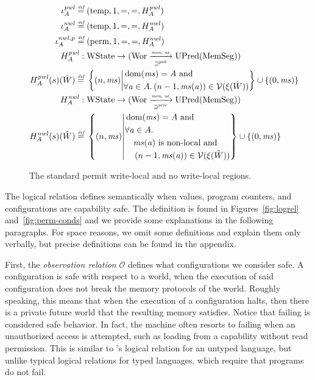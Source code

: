 \documentclass[format=acmsmall, review=true, screen=true]{acmart}
\renewcommand{\figurename}{Figure}
\newcommand{\fun}{\rightarrow}
\newcommand{\defeq}{\stackrel{\textit{\tiny{def}}}{=}}
\newcommand{\union}{\mathbin{\cup}}
\DeclareMathOperator{\dom}{dom}
\newcommand\dominique[1]{{\color{purple} \sf \footnotesize {DD: #1}}\\}
\renewcommand\dominique[1]{}
\newcommand{\var}[1]{\mathit{#1}}
\newcommand{\hs}{\var{ms}}
\newcommand{\ms}{\hs}
\newcommand{\addr}{\var{a}}
\newcommand{\nwl}{\var{nwl}}
\newcommand{\pwl}{\var{pwl}}
\newcommand{\futurewk}{\mathbin{\sqsupseteq}^{\var{pub}}}
\newcommand{\futurestr}{\mathbin{\sqsupseteq}^{\var{priv}}}
\newcommand{\monwknefun}{\xrightarrow[\text{\tiny{$\futurewk$}}]{\textit{\tiny{mon, ne}}}}
\newcommand{\monstrnefun}{\xrightarrow[\text{\tiny{$\futurestr$}}]{\textit{\tiny{mon, ne}}}}
\newcommand{\asmType}{\plaindom{AsmType}}
\newcommand{\plaindom}[1]{\mathrm{#1}}
\newcommand{\HeapSegments}{\plaindom{MemSeg}}
\newcommand{\States}{\plaindom{WState}}
\newcommand{\Wor}{\plaindom{Wor}}
\newcommand{\UPred}[1]{\plaindom{UPred}(#1)}
\newcommand{\intr}[2]{\mathcal{#1}}
\newcommand{\valueintr}[1]{\intr{V}{#1}}
\newcommand{\stdvr}{\valueintr{\asmType}}
\newcommand{\observations}{\mathcal{O}}
\newcommand{\npair}[2][n]{\left(#1,#2 \right)}
\newcommand{\plainview}[1]{\mathrm{#1}}
\newcommand{\perma}{\plainview{perm}}
\newcommand{\temp}{\plainview{temp}}
\newcommand{\nonlocal}[1]{\ensuremath{#1} \text{ is non-local}}
\begin{document}
{\begin{figure}[htb]
\begin{align*}
  \iota^\pwl_A \defeq{} & (\temp,1,=,=,H^\pwl_A) \\
  \iota^\nwl_A \defeq{} & (\temp,1,=,=,H^\nwl_A) \\
  \iota^{\nwl,p}_A \defeq{} & (\perma,1,=,=,H^\nwl_A)\\
    H^\pwl_A :{} & \States \fun (\Wor \monwknefun \UPred{\HeapSegments})\\
  H^\pwl_A (s)(\hat{W}) \defeq{} & \left\{\npair{\hs} \middle|
    \begin{aligned}
      &\dom(\hs) = A \text{ and } \\
      &\forall \addr \in A \ldotp \npair[n-1]{\hs(\addr)} \in \stdvr(\xi(\hat{W}))
    \end{aligned}
        \right\} \union \{\npair[0]{\ms} \} \\
    H^\nwl_A :{} & \States \fun (\Wor \monstrnefun \UPred{\HeapSegments})\\
  H^\nwl_A (s)(\hat{W}) \defeq{} & \left\{\npair{\hs} \middle|
    \begin{aligned}
      &\dom(\hs) = A \text{ and } \\
      &\forall \addr \in A \ldotp \\
      &\quad \nonlocal{\ms(\addr)} \text{ and }\\ 
      &\quad \npair[n-1]{\hs(\addr)} \in \stdvr(\xi(\hat{W}))
    \end{aligned}
        \right\} \union \{\npair[0]{\ms} \}
\end{align*}

  \caption{The standard permit write-local and no write-local regions.}
  \label{fig:std-reg}
\end{figure}
}


The logical relation defines semantically when values, program
counters, and configurations are capability safe. The definition is
found in \figurename{}s~\ref{fig:logrel} and~\ref{fig:perm-conds} and
we provide some explanations in the following paragraphs. For space
reasons, we omit some definitions and explain them only verbally, but
precise definitions can be found in the appendix.

First, the \emph{observation relation} $\observations$ defines what
configurations we consider safe. A configuration is safe
with respect to a world, when the execution of said configuration does not break
the memory protocols of the world. Roughly speaking, this means that when the
execution of a configuration halts, then there is a private future world that
the resulting memory satisfies. Notice that failing is considered safe behavior.
In fact, the machine often resorts to failing when an unauthorized access is
attempted, such as loading from a capability without read permission. This is
similar to \citet{Devriese:2016ObjCap}'s logical relation for an untyped
language, but unlike typical logical relations for typed languages, which
require that programs do not fail.
\end{document}
